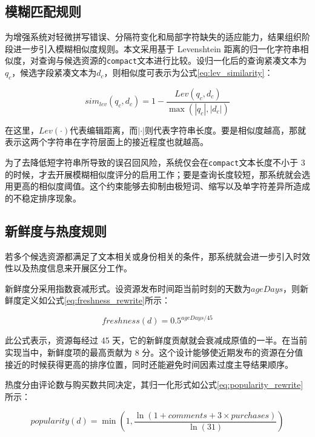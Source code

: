 \subsection{模糊匹配规则}

为增强系统对轻微拼写错误、分隔符变化和局部字符缺失的适应能力，结果组织阶段进一步引入模糊相似度规则。本文采用基于 Levenshtein 距离的归一化字符串相似度，对查询与候选资源的\texttt{compact}文本进行比较。设归一化后的查询紧凑文本为$q_c$，候选字段紧凑文本为$d_c$，则相似度可表示为公式\eqref{eq:lev_similarity}：

\begin{equation}
    sim_{lev}(q_c,d_c)=1-\frac{Lev(q_c,d_c)}{\max(|q_c|,|d_c|)}
    \label{eq:lev_similarity}
\end{equation}

在这里，$Lev(\cdot)$代表编辑距离，而$|\cdot|$则代表字符串长度。要是相似度越高，那就表示这两个字符串在字符层面上的接近程度也就越高。

为了去降低短字符串所导致的误召回风险，系统仅会在\texttt{compact}文本长度不小于 3 的时候，才去开展模糊相似度评分的启用工作；要是查询长度较短，那系统就会选用更高的相似度阈值。这个约束能够去抑制由极短词、缩写以及单字符差异所造成的不稳定排序现象。

\subsection{新鲜度与热度规则}

若多个候选资源都满足了文本相关或身份相关的条件，那系统就会进一步引入时效性以及热度信息来开展区分工作。

新鲜度分采用指数衰减形式。设资源发布时间距当前时刻的天数为$ageDays$，则新鲜度定义如公式\eqref{eq:freshness_rewrite}所示：

\begin{equation}
    freshness(d)=0.5^{ageDays/45}
    \label{eq:freshness_rewrite}
\end{equation}

此公式表示，资源每经过 45 天，它的新鲜度贡献就会衰减成原值的一半。在当前实现当中，新鲜度项的最高贡献为 8 分。这个设计能够使近期发布的资源在分值接近的时候获得更高的排序位置，同时还能避免时间因素过度主导结果顺序。

热度分由评论数与购买数共同决定，其归一化形式如公式\eqref{eq:popularity_rewrite}所示：

\begin{equation}
    popularity(d)=\min\left(1,\frac{\ln(1+comments+3\times purchases)}{\ln(31)}\right)
    \label{eq:popularity_rewrite}
\end{equation}


